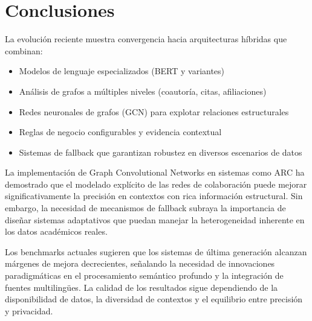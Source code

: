 \documentclass{article}
\begin{document}
\section{Conclusiones}
La evolución reciente muestra convergencia hacia arquitecturas híbridas que combinan:
\begin{itemize}[leftmargin=*]
\item Modelos de lenguaje especializados (BERT y variantes)
\item Análisis de grafos a múltiples niveles (coautoría, citas, afiliaciones)
\item Redes neuronales de grafos (GCN) para explotar relaciones estructurales \cite{ARC2025}
\item Reglas de negocio configurables y evidencia contextual
\item Sistemas de fallback que garantizan robustez en diversos escenarios de datos
\end{itemize}

La implementación de Graph Convolutional Networks en sistemas como ARC ha demostrado que el modelado explícito de las redes de colaboración puede mejorar significativamente la precisión en contextos con rica información estructural. Sin embargo, la necesidad de mecanismos de fallback subraya la importancia de diseñar sistemas adaptativos que puedan manejar la heterogeneidad inherente en los datos académicos reales.

Los benchmarks actuales sugieren que los sistemas de última generación alcanzan márgenes de mejora decrecientes, señalando la necesidad de innovaciones paradigmáticas en el procesamiento semántico profundo y la integración de fuentes multilingües. La calidad de los resultados sigue dependiendo de la disponibilidad de datos, la diversidad de contextos y el equilibrio entre precisión y privacidad.
\end{document}
